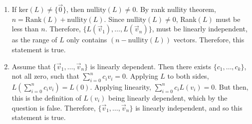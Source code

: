 \documentclass[10pt,english]{article}
\begin{document}
\begin{enumerate}
\begin{enumerate}
    \item If ker$(L)\neq\{\vec{0}\}$, then nullity$(L)\neq0$. By rank nullity theorem, $n=\text{Rank}(L)+\text{nullity}(L)$. Since nullity$(L)\neq0$, Rank$(L)$ must be less than $n$. Therefore, $\{L(\vec{v}_1),\ldots,L(\vec{v}_n)\}$, must be linearly independent, as the range of $L$ only contains $(n-\text{nullity}(L))$ vectors. Therefore, this statement is true.
    
    
    \item Assume that $\{\vec{v}_1,\ldots,\vec{v}_n\}$ is linearly dependent. Then there exists $\{c_1,\ldots,c_k\}$, not all zero, such that $\sum_{i=0}^nc_iv_i=0$. Applying $L$ to both sides, $L(\sum_{i=0}^nc_iv_i)=L(0)$. Applying linearity, $\sum_{i=0}^nc_iL(v_i)=0$. But then, this is the definition of $L(v_i)$ being linearly dependent, which by the question is false. Therefore, $\{\vec{v}_1,\ldots,\vec{v}_n\}$ is linearly independent, and so this statement is true. 
    
    
\end{enumerate}
\end{enumerate}
\end{document}
